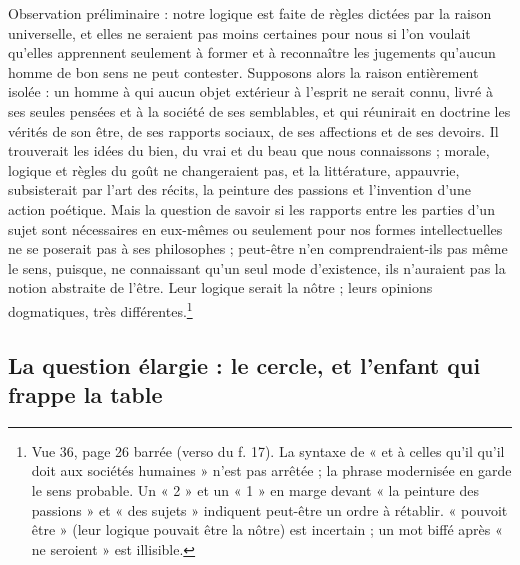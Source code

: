 \documentclass[11pt,a4paper]{article}
\begin{document}
Observation préliminaire : notre logique est faite de règles dictées par la
raison universelle, et elles ne seraient pas moins certaines pour nous si l'on
voulait qu'elles apprennent seulement à former et à reconnaître les jugements
qu'aucun homme de bon sens ne peut contester. Supposons alors la raison
entièrement isolée : un homme à qui aucun objet extérieur à l'esprit ne serait
connu, livré à ses seules pensées et à la société de ses semblables, et qui
réunirait en doctrine les vérités de son être, de ses rapports sociaux, de ses
affections et de ses devoirs. Il trouverait les idées du bien, du vrai et du
beau que nous connaissons ; morale, logique et règles du goût ne changeraient
pas, et la littérature, appauvrie, subsisterait par l'art des récits, la
peinture des passions et l'invention d'une action poétique. Mais la question
de savoir si les rapports entre les parties d'un sujet sont nécessaires en
eux-mêmes ou seulement pour nos formes intellectuelles ne se poserait pas à ses
philosophes ; peut-être n'en comprendraient-ils pas même le sens, puisque,
ne connaissant qu'un seul mode d'existence, ils n'auraient pas la notion
abstraite de l'être. Leur logique serait la nôtre ; leurs opinions dogmatiques,
très différentes.\footnote{Vue 36, page 26 barrée (verso du f. 17). La syntaxe
de « et à celles qu'il qu'il doit aux sociétés humaines » n'est pas arrêtée ;
la phrase modernisée en garde le sens probable. Un « 2 » et un « 1 » en marge
devant « la peinture des passions » et « des sujets » indiquent peut-être un
ordre à rétablir. « pouvoit être » (leur logique pouvait être la nôtre) est
incertain ; un mot biffé après « ne seroient » est illisible.}

\subsection*{La question élargie : le cercle, et l'enfant qui frappe la table}
\end{document}
